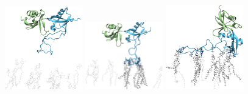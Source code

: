 \documentclass[
  twocolumn]{biophys-new-mod}
\begin{document}
\begin{figure}

\begin{minipage}[t]{\linewidth}

{\centering 

\includegraphics[width=0.3\textwidth,height=\textheight]{./assets/vmd/f0f1/unbround-trim.png}
\includegraphics[width=0.3\textwidth,height=\textheight]{./assets/vmd/f0f1/anchored-trim.png}
\includegraphics[width=0.3\textwidth,height=\textheight]{./assets/vmd/f0f1/bound-trim.png}

}

\subcaption{\label{fig-f0f1-snapshots}~}
\end{minipage}%
\newline
\begin{minipage}[t]{\linewidth}

{\centering 

}
\end{minipage}
\end{figure}
\end{document}
